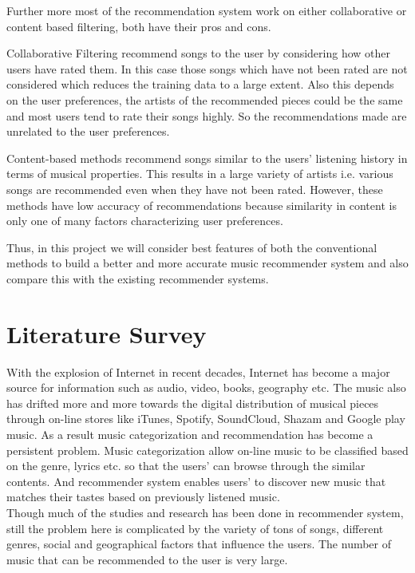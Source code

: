 \documentclass{sig-alternate-05-2015}
\begin{document}
Further more most of the recommendation system work on either collaborative or content based filtering, both have their pros and cons.

Collaborative Filtering recommend songs to the user by considering how other users have rated them. In this case those songs which have not been rated are not considered which reduces the training data to a large extent. Also this depends on the user preferences, the artists of the recommended pieces could be the same and most users tend to rate their songs highly. So the recommendations made are unrelated to the user preferences.
 
Content-based methods recommend songs similar to the users' listening history in terms of musical properties. This results in a large variety of artists i.e. various songs are recommended even when they have not been rated. However, these methods have low accuracy of recommendations because similarity in content is only one of many factors characterizing user preferences.

Thus, in this project we will consider best features of both the conventional methods to build a better and more accurate music recommender system and also compare this with the existing recommender systems.


\section{Literature Survey}
With the explosion of Internet in recent decades, Internet has become a major source for information such as audio, video, books, geography etc. The music also has drifted more and more towards the digital distribution of musical pieces through on-line stores like iTunes, Spotify, SoundCloud, Shazam and Google play music. As a result music categorization and recommendation has become a persistent problem. Music categorization allow on-line music to be classified based on the genre, lyrics etc. so that the users' can browse through the similar contents. And recommender system enables users' to discover new music that matches their tastes based on previously listened music.\\

Though much of the studies and research has been done in recommender system, still the problem here is complicated by the variety of tons of songs, different genres, social and geographical factors that influence the users. The number of music that can be recommended to the user is very large.\\
\end{document}
